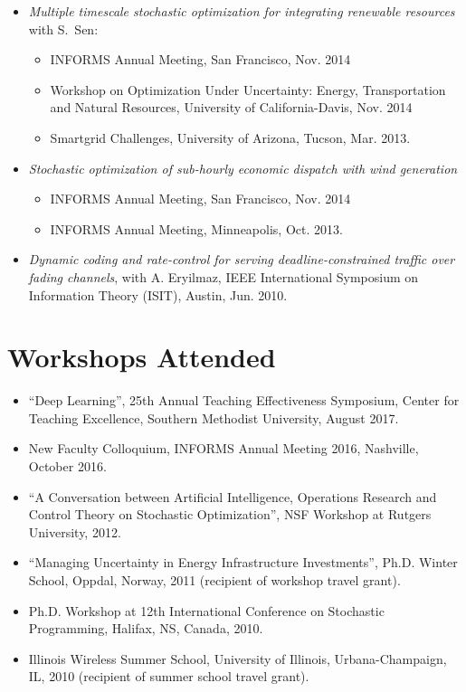 \documentclass[hyperref, margin]{myResume}
\begin{document}
\begin{resume}
\begin{itemize}[leftmargin=*]
		\item \textit{Multiple timescale stochastic optimization for integrating renewable resources} with S.\ Sen:
		\begin{itemize}[leftmargin=1em]
			\item INFORMS Annual Meeting, San Francisco, Nov. 2014
			\item Workshop on Optimization Under Uncertainty: Energy, Transportation and Natural Resources, University of California-Davis, Nov. 2014
			\item Smartgrid Challenges, University of Arizona, Tucson, Mar. 2013.
		\end{itemize}
		\item \textit{Stochastic optimization of sub-hourly economic dispatch with wind generation}
		\begin{itemize}[leftmargin=1em]
			\item INFORMS Annual Meeting, San Francisco, Nov. 2014
			\item INFORMS Annual Meeting, Minneapolis, Oct. 2013.
		\end{itemize}
		\item \textit{Dynamic coding and rate-control for serving deadline-constrained traffic over fading channels}, with A. Eryilmaz, IEEE International Symposium on Information Theory (ISIT), Austin, Jun. 2010.
	\end{itemize}
	
\section{Workshops Attended}
	\begin{itemize}[leftmargin=*]
		\item ``Deep Learning'', 25th Annual Teaching Effectiveness Symposium, Center for Teaching Excellence, Southern Methodist University, August 2017.		
		\item New Faculty Colloquium, INFORMS Annual Meeting 2016, Nashville, October 2016.
		\item ``A Conversation between Artificial Intelligence, Operations Research and Control Theory on Stochastic Optimization'', NSF Workshop at Rutgers University, 2012.
		\item ``Managing Uncertainty in Energy Infrastructure Investments'', Ph.D. Winter School, Oppdal, Norway, 2011 (recipient of workshop travel grant).
		\item Ph.D. Workshop at 12th International Conference on Stochastic Programming, Halifax, NS, Canada, 2010.
		\item Illinois Wireless Summer School, University of Illinois, Urbana-Champaign, IL, 2010 (recipient of summer school travel grant).
	\end{itemize}
	
\end{resume} 
\end{document}
